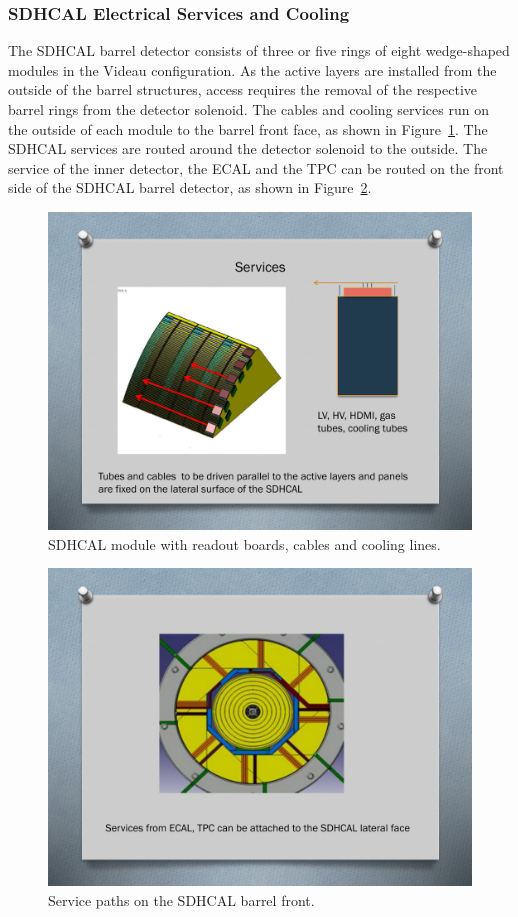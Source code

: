 \subsubsection{SDHCAL Electrical Services and Cooling}
The SDHCAL barrel detector consists of three or five rings of eight wedge-shaped modules in the Videau configuration. As the active layers are installed from the outside of the barrel structures, access requires the removal of the respective barrel rings from the detector solenoid. The cables and cooling services run on the outside of each module to the barrel front face, as shown in Figure~\ref{ILD:fig:sdcal_module_services}. The SDHCAL services are routed around the detector solenoid to the outside. The service of the inner detector, the ECAL and the TPC can be routed on the front side of the SDHCAL barrel detector, as shown in Figure~\ref{ILD:fig:sdhcal_barrel_services}.
\begin{figure}[h!]
    \centering
        \includegraphics[width=0.8\hsize]{Integration/fig/SDHCAL_Module_Services.pdf}
    \caption{SDHCAL module with readout boards, cables and cooling lines.}
    \label{ILD:fig:sdcal_module_services}
\end{figure}
\begin{figure}[h!]
    \centering
        \includegraphics[width=0.8\hsize]{Integration/fig/SDHCAL_Barrel_Services.pdf}
    \caption{Service paths on the SDHCAL barrel front.}
    \label{ILD:fig:sdhcal_barrel_services}
\end{figure}

